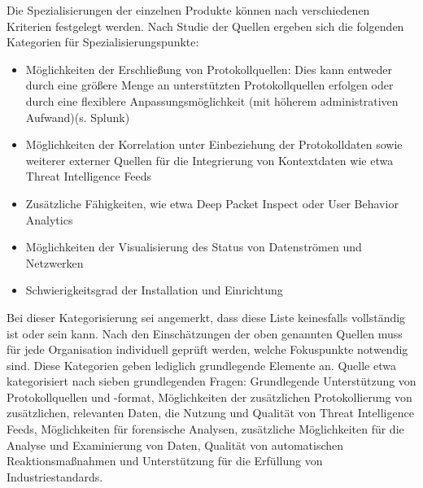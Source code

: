 Die Spezialisierungen der einzelnen Produkte können nach verschiedenen Kriterien festgelegt werden. Nach Studie der Quellen ergeben sich die folgenden Kategorien für Spezialisierungspunkte:
\begin{itemize}
\item Möglichkeiten der Erschließung von Protokollquellen: Dies kann entweder durch eine größere Menge an unterstützten Protokollquellen erfolgen oder durch eine flexiblere Anpassungsmöglichkeit (mit höherem administrativen Aufwand)(s. Splunk)
\item Möglichkeiten der Korrelation unter Einbeziehung der Protokolldaten sowie weiterer externer Quellen für die Integrierung von Kontextdaten wie etwa Threat Intelligence Feeds
\item Zusätzliche Fähigkeiten, wie etwa \glqq Deep Packet Inspect\grqq{}  oder \glqq User Behavior Analytics\grqq{}
\item Möglichkeiten der Visualisierung des Status von Datenströmen und Netzwerken
\item Schwierigkeitsgrad der Installation und Einrichtung
\end{itemize}

Bei dieser Kategorisierung sei angemerkt, dass diese Liste keinesfalls vollständig ist oder sein kann. Nach den Einschätzungen der oben genannten Quellen muss für jede Organisation individuell geprüft werden, welche Fokuspunkte notwendig sind. Diese Kategorien geben lediglich grundlegende Elemente an.
Quelle \cite{SIEMVendors5}
etwa kategorisiert nach sieben grundlegenden Fragen: Grundlegende Unterstützung von Protokollquellen und -format, Möglichkeiten der zusätzlichen Protokollierung von zusätzlichen, relevanten Daten, die Nutzung und Qualität von Threat Intelligence Feeds, Möglichkeiten für forensische Analysen, zusätzliche Möglichkeiten für die Analyse und Examinierung von Daten, Qualität von automatischen Reaktionsmaßnahmen und Unterstützung für die Erfüllung von Industriestandards. 

